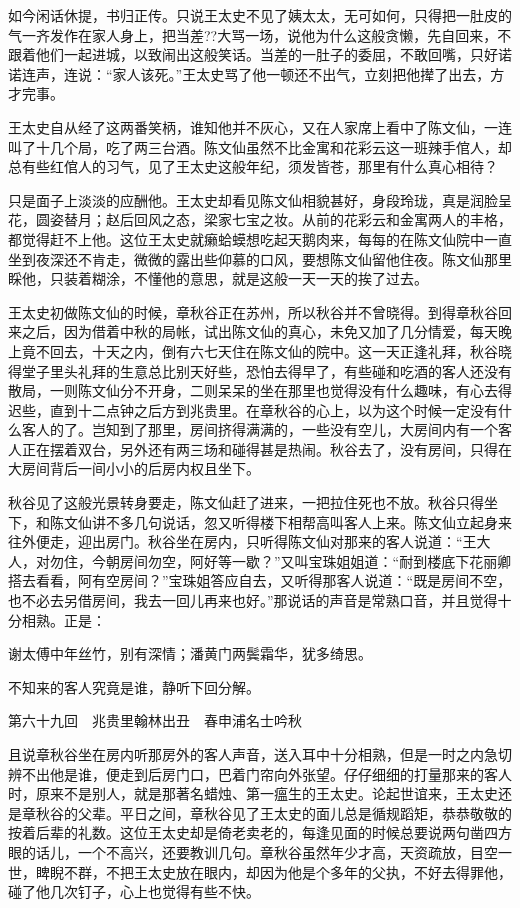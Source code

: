 \documentclass[12pt,UTF8]{ctexbook}
\begin{document}
{{{如今闲话休提，书归正传。只说王太史不见了姨太太，无可如何，只得把一肚皮的气一齐发作在家人身上，把当差??大骂一场，说他为什么这般贪懒，先自回来，不跟着他们一起进城，以致闹出这般笑话。当差的一肚子的委屈，不敢回嘴，只好诺诺连声，连说：“家人该死。”王太史骂了他一顿还不出气，立刻把他撵了出去，方才完事。

王太史自从经了这两番笑柄，谁知他并不灰心，又在人家席上看中了陈文仙，一连叫了十几个局，吃了两三台酒。陈文仙虽然不比金寓和花彩云这一班辣手倌人，却总有些红倌人的习气，见了王太史这般年纪，须发皆苍，那里有什么真心相待？

只是面子上淡淡的应酬他。王太史却看见陈文仙相貌甚好，身段玲珑，真是润脸呈花，圆姿替月；赵后回风之态，梁家七宝之妆。从前的花彩云和金寓两人的丰格，都觉得赶不上他。这位王太史就癞蛤蟆想吃起天鹅肉来，每每的在陈文仙院中一直坐到夜深还不肯走，微微的露出些仰慕的口风，要想陈文仙留他住夜。陈文仙那里睬他，只装着糊涂，不懂他的意思，就是这般一天一天的挨了过去。

王太史初做陈文仙的时候，章秋谷正在苏州，所以秋谷并不曾晓得。到得章秋谷回来之后，因为借着中秋的局帐，试出陈文仙的真心，未免又加了几分情爱，每天晚上竟不回去，十天之内，倒有六七天住在陈文仙的院中。这一天正逢礼拜，秋谷晓得堂子里头礼拜的生意总比别天好些，恐怕去得早了，有些碰和吃酒的客人还没有散局，一则陈文仙分不开身，二则呆呆的坐在那里也觉得没有什么趣味，有心去得迟些，直到十二点钟之后方到兆贵里。在章秋谷的心上，以为这个时候一定没有什么客人的了。岂知到了那里，房间挤得满满的，一些没有空儿，大房间内有一个客人正在摆着双台，另外还有两三场和碰得甚是热闹。秋谷去了，没有房间，只得在大房间背后一间小小的后房内权且坐下。

秋谷见了这般光景转身要走，陈文仙赶了进来，一把拉住死也不放。秋谷只得坐下，和陈文仙讲不多几句说话，忽又听得楼下相帮高叫客人上来。陈文仙立起身来往外便走，迎出房门。秋谷坐在房内，只听得陈文仙对那来的客人说道：“王大人，对勿住，今朝房间勿空，阿好等一歇？”又叫宝珠姐姐道：“耐到楼底下花丽卿搭去看看，阿有空房间？”宝珠姐答应自去，又听得那客人说道：“既是房间不空，也不必去另借房间，我去一回儿再来也好。”那说话的声音是常熟口音，并且觉得十分相熟。正是：

谢太傅中年丝竹，别有深情；潘黄门两鬓霜华，犹多绮思。

不知来的客人究竟是谁，静听下回分解。





第六十九回　兆贵里翰林出丑　春申浦名士吟秋





且说章秋谷坐在房内听那房外的客人声音，送入耳中十分相熟，但是一时之内急切辨不出他是谁，便走到后房门口，巴着门帘向外张望。仔仔细细的打量那来的客人时，原来不是别人，就是那著名蜡烛、第一瘟生的王太史。论起世谊来，王太史还是章秋谷的父辈。平日之间，章秋谷见了王太史的面儿总是循规蹈矩，恭恭敬敬的按着后辈的礼数。这位王太史却是倚老卖老的，每逢见面的时候总要说两句凿四方眼的话儿，一个不高兴，还要教训几句。章秋谷虽然年少才高，天资疏放，目空一世，睥睨不群，不把王太史放在眼内，却因为他是个多年的父执，不好去得罪他，碰了他几次钉子，心上也觉得有些不快。

}}}
\end{document}
